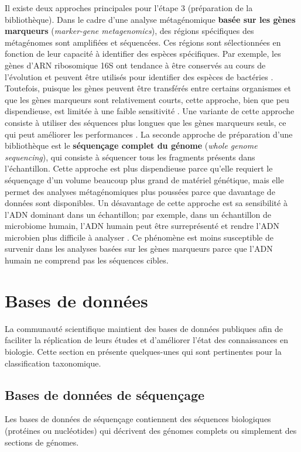 Il existe deux approches principales pour l'étape 3 (préparation de la bibliothèque). Dans le cadre
d'une analyse métagénomique \textbf{basée sur les gènes marqueurs} (\textit{marker-gene
metagenomics}), des régions spécifiques des métagénomes sont amplifiées et séquencées. Ces régions
sont sélectionnées en fonction de leur capacité à identifier des espèces spécifiques. Par exemple,
les gènes d'ARN ribosomique 16S ont tendance à être conservés au cours de l'évolution et peuvent
être utilisés pour identifier des espèces de bactéries \cite{johnson2019evaluation}. Toutefois,
puisque les gènes peuvent être transférés entre certains organismes et que les gènes marqueurs sont
relativement courts, cette approche, bien que peu dispendieuse, est limitée à une faible sensitivité
\cite{Matchado2024}. Une variante de cette approche consiste à utiliser des séquences plus longues
que les gènes marqueurs seuls, ce qui peut améliorer les performances \cite{BenitezPaez2022}. La
seconde approche de préparation d'une bibliothèque est le \textbf{séquençage complet du génome}
(\textit{whole genome sequencing}), qui consiste à séquencer tous les fragments présents dans
l'échantillon. Cette approche est plus dispendieuse parce qu'elle requiert le séquençage d'un volume
beaucoup plus grand de matériel génétique, mais elle permet des analyses métagénomiques plus
poussées parce que davantage de données sont disponibles. Un désavantage de cette approche est sa
sensibilité à l'ADN dominant dans un échantillon; par exemple, dans un échantillon de microbiome
humain, l'ADN humain peut être surreprésenté et rendre l'ADN microbien plus difficile à analyser
\cite{Matchado2024}. Ce phénomène est moins susceptible de survenir dans les analyses basées sur les
gènes marqueurs parce que l'ADN humain ne comprend pas les séquences cibles.

\section{Bases de données}
La communauté scientifique maintient des bases de données publiques afin de faciliter la réplication
de leurs études et d'améliorer l'état des connaissances en biologie. Cette section en présente
quelques-unes qui sont pertinentes pour la classification taxonomique.

\subsection{Bases de données de séquençage}
Les bases de données de séquençage contiennent des séquences biologiques (protéines ou nucléotides)
qui décrivent des génomes complets ou simplement des sections de génomes.

